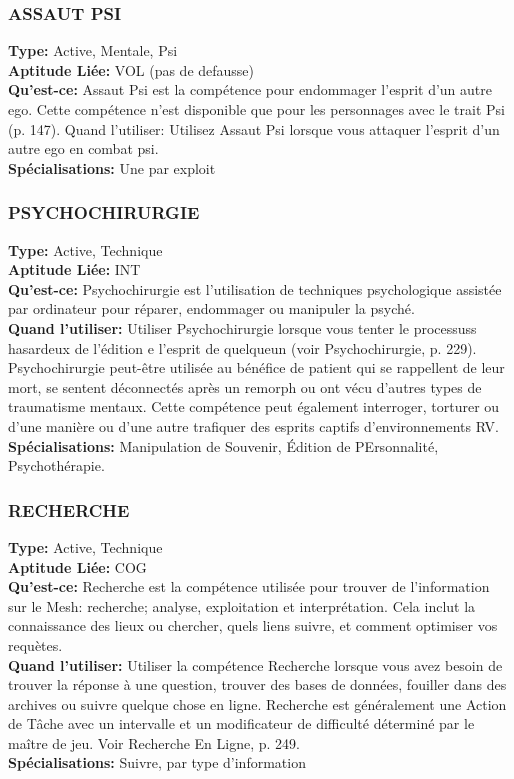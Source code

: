 \subsubsection{ASSAUT PSI} 
\textbf{Type:} Active, Mentale, Psi \\
\textbf{Aptitude Liée:} VOL (pas de defausse) \\
\textbf{Qu'est-ce:} Assaut Psi est la compétence pour endommager l'esprit d'un autre ego. Cette compétence n'est disponible que pour les personnages avec le trait Psi (p. 147). Quand l'utiliser: Utilisez Assaut Psi lorsque vous attaquer l'esprit d'un autre ego en combat psi. \\
\textbf{Spécialisations:} Une par exploit 

\subsubsection{PSYCHOCHIRURGIE} \textbf{Type:} Active, Technique\\ \textbf{Aptitude Liée:} INT \\ \textbf{Qu'est-ce:} Psychochirurgie est l'utilisation de techniques psychologique assistée par ordinateur pour réparer, endommager ou manipuler la psyché. \\ \textbf{Quand l'utiliser:} Utiliser Psychochirurgie lorsque vous tenter le processuss hasardeux de l'édition e l'esprit de quelqueun (voir Psychochirurgie, p. 229). Psychochirurgie peut-être utilisée au bénéfice de patient qui se rappellent de leur mort, se sentent déconnectés après un remorph ou ont vécu d'autres types de traumatisme mentaux. Cette compétence peut également interroger, torturer ou d'une manière ou d'une autre trafiquer des esprits captifs d'environnements RV. \\ \textbf{Spécialisations:} Manipulation de Souvenir, Édition de PErsonnalité, Psychothérapie. 

\subsubsection{RECHERCHE} \textbf{Type:} Active, Technique\\ \textbf{Aptitude Liée:} COG \\ \textbf{Qu'est-ce:} Recherche est la compétence utilisée pour trouver de l'information sur le Mesh: recherche; analyse, exploitation et interprétation. Cela inclut la connaissance des lieux ou chercher, quels liens suivre, et comment optimiser vos requètes. \\ \textbf{Quand l'utiliser:} Utiliser la compétence Recherche lorsque vous avez besoin de trouver la réponse à une question, trouver des bases de données, fouiller dans des archives ou suivre quelque chose en ligne. Recherche est généralement une Action de Tâche avec un intervalle et un modificateur de difficulté déterminé par le maître de jeu. Voir Recherche En Ligne, p. 249. \\ \textbf{Spécialisations:} Suivre, par type d'information 


